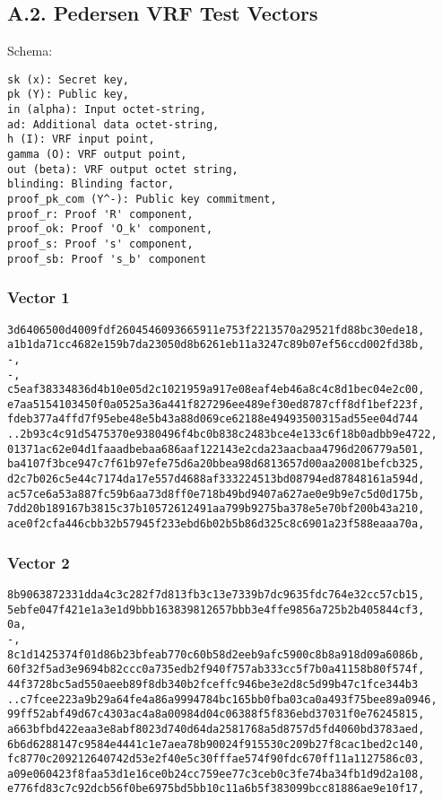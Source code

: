 \documentclass[
]{article}
\begin{document}
\hypertarget{a.2.-pedersen-vrf-test-vectors}{%
\subsection{A.2. Pedersen VRF Test
Vectors}\label{a.2.-pedersen-vrf-test-vectors}}

Schema:

\begin{verbatim}
sk (x): Secret key,
pk (Y): Public key,
in (alpha): Input octet-string,
ad: Additional data octet-string,
h (I): VRF input point,
gamma (O): VRF output point,
out (beta): VRF output octet string,
blinding: Blinding factor,
proof_pk_com (Y^-): Public key commitment,
proof_r: Proof 'R' component,
proof_ok: Proof 'O_k' component,
proof_s: Proof 's' component,
proof_sb: Proof 's_b' component
\end{verbatim}

\hypertarget{vector-1-1}{%
\subsubsection{Vector 1}\label{vector-1-1}}

\begin{verbatim}
3d6406500d4009fdf2604546093665911e753f2213570a29521fd88bc30ede18,
a1b1da71cc4682e159b7da23050d8b6261eb11a3247c89b07ef56ccd002fd38b,
-,
-,
c5eaf38334836d4b10e05d2c1021959a917e08eaf4eb46a8c4c8d1bec04e2c00,
e7aa5154103450f0a0525a36a441f827296ee489ef30ed8787cff8df1bef223f,
fdeb377a4ffd7f95ebe48e5b43a88d069ce62188e49493500315ad55ee04d744
..2b93c4c91d5475370e9380496f4bc0b838c2483bce4e133c6f18b0adbb9e4722,
01371ac62e04d1faaadbebaa686aaf122143e2cda23aacbaa4796d206779a501,
ba4107f3bce947c7f61b97efe75d6a20bbea98d6813657d00aa20081befcb325,
d2c7b026c5e44c7174da17e557d4688af333224513bd08794ed87848161a594d,
ac57ce6a53a887fc59b6aa73d8ff0e718b49bd9407a627ae0e9b9e7c5d0d175b,
7dd20b189167b3815c37b10572612491aa799b9275ba378e5e70bf200b43a210,
ace0f2cfa446cbb32b57945f233ebd6b02b5b86d325c8c6901a23f588eaaa70a,
\end{verbatim}

\hypertarget{vector-2-1}{%
\subsubsection{Vector 2}\label{vector-2-1}}

\begin{verbatim}
8b9063872331dda4c3c282f7d813fb3c13e7339b7dc9635fdc764e32cc57cb15,
5ebfe047f421e1a3e1d9bbb163839812657bbb3e4ffe9856a725b2b405844cf3,
0a,
-,
8c1d1425374f01d86b23bfeab770c60b58d2eeb9afc5900c8b8a918d09a6086b,
60f32f5ad3e9694b82ccc0a735edb2f940f757ab333cc5f7b0a41158b80f574f,
44f3728bc5ad550aeeb89f8db340b2fceffc946be3e2d8c5d99b47c1fce344b3
..c7fcee223a9b29a64fe4a86a9994784bc165bb0fba03ca0a493f75bee89a0946,
99ff52abf49d67c4303ac4a8a00984d04c06388f5f836ebd37031f0e76245815,
a663bfbd422eaa3e8abf8023d740d64da2581768a5d8757d5fd4060bd3783aed,
6b6d6288147c9584e4441c1e7aea78b90024f915530c209b27f8cac1bed2c140,
fc8770c209212640742d53e2f40e5c30fffae574f90fdc670ff11a1127586c03,
a09e060423f8faa53d1e16ce0b24cc759ee77c3ceb0c3fe74ba34fb1d9d2a108,
e776fd83c7c92dcb56f0be6975bd5bb10c11a6b5f383099bcc81886ae9e10f17,
\end{verbatim}
\end{document}
